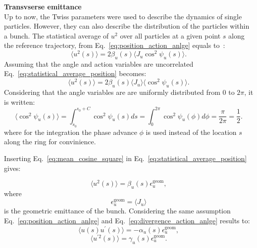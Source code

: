  \textbf{Transvserse emittance}\\
Up to now, the Twiss parameters were used to describe the dynamics of single particles. However, they can also describe the distribution of the particles within a bunch. The statistical average of $u^2$ over all particles at a given point $s$ along the reference trajectory, from Eq.~\eqref{eq:position_action_anlge} equals to~\cite{wolski2014}:
 \begin{equation}\label{eq:statistical_average_position}
     \langle u^2(s) \rangle = 2 \beta_u(s) \langle J_u \cos^2{\psi_u(s)} \rangle.
 \end{equation}
 Assuming that the angle and action variables are uncorrelated Eq.~\eqref{eq:statistical_average_position} becomes:
 \begin{equation}\label{eq:statistical_average_position_2}
     \langle u^2(s) \rangle = 2 \beta_u(s) \langle J_u \rangle \langle \cos^2{\psi_u(s)} \rangle.
 \end{equation}
 Considering that the angle variables are are uniformly distributed from 0 to $2\pi$, it is written: %
 \begin{equation}\label{eq:mean_cosine_square}
     \langle \cos^2{\psi_u(s)} \rangle = \int_{s_0}^{s_0+C} \cos^2{\psi_u(s)} ds =   \int_0^{2\pi} \cos^2{\psi_u(\phi)} d\phi = \frac{\pi}{2\pi} = \frac{1}{2}.
 \end{equation}
 where for the integration the phase advance $\phi$ is used instead of the location $s$ along the ring for convinience. %
 
 Inserting Eq.~\eqref{eq:mean_cosine_square} in Eq.~\eqref{eq:statistical_average_position} gives:
 
 \begin{equation}\label{eq:emittance_definition_1}
     \langle u^2(s) \rangle = \beta_u(s)  \epsilon^{\mathrm{geom}}_u,
 \end{equation}
 where
 \begin{equation}\label{eq:geom_emittance_action}
     \epsilon^{\mathrm{geom}}_u=\langle J_u \rangle
 \end{equation}
 is the geometric emittance of the bunch. Considering the same assumption Eq.~\eqref{eq:position_action_anlge} and  Eq.~\eqref{eq:divergence_action_anlge} results to:
 \begin{equation}\label{eq:u_uprime_eq_1}
     \langle u(s) u^\prime(s) \rangle = - \alpha_u(s) \epsilon^{\mathrm{geom}}_u,
 \end{equation}
 \begin{equation}\label{eq:u_uprime_eq_2}
     \langle u^{\prime 2}(s) \rangle = \gamma_u(s) \epsilon^{\mathrm{geom}}_u.
 \end{equation}
 
